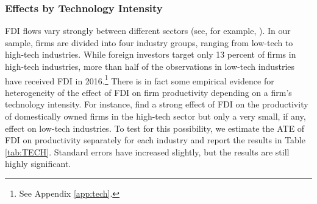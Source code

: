 \documentclass[a4paper,11pt]{scrartcl}
\begin{document}
\begin{table}[h]
\begin{threeparttable}
\begin{tablenotes}[flushleft]

 
\end{tablenotes}

\end{threeparttable}
\end{table}

\subsubsection*{Effects by Technology Intensity}

FDI flows vary strongly between different sectors (see, for example, \citet{Smarzynska2004, Keller2009, Haskel2007}). In our sample, firms are divided into four industry groups, ranging from low-tech to high-tech industries. While foreign investors target only 13 percent of firms in high-tech industries, more than half of the observations in low-tech industries have received FDI in 2016.\footnote{See Appendix \ref{app:tech}.} There is in fact some empirical evidence for heterogeneity of the effect of FDI on firm productivity depending on a firm's technology intensity. For instance, \citet{Keller2009} find a strong effect of FDI on the productivity of domestically owned firms in the high-tech sector but only a very small, if any, effect on low-tech industries. To test for this possibility, we estimate the ATE of FDI on productivity separately for each industry and report the results in Table \ref{tab:TECH}. Standard errors have increased slightly, but the results are still highly significant. 
\end{document}
